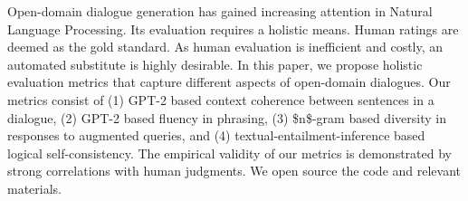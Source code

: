 Open-domain dialogue generation has gained increasing attention in Natural Language Processing. Its evaluation requires a holistic means. Human ratings are deemed as the gold standard. As human evaluation is inefficient and costly, an automated substitute is highly desirable. In this paper, we propose holistic evaluation metrics that capture different aspects of open-domain dialogues. Our metrics consist of (1) GPT-2 based context coherence between sentences in a dialogue, (2) GPT-2 based fluency in phrasing, (3) \$n\$-gram based diversity in responses to augmented queries, and (4) textual-entailment-inference based logical self-consistency. The empirical validity of our metrics is demonstrated by strong correlations with human judgments. We open source the code and relevant materials.
